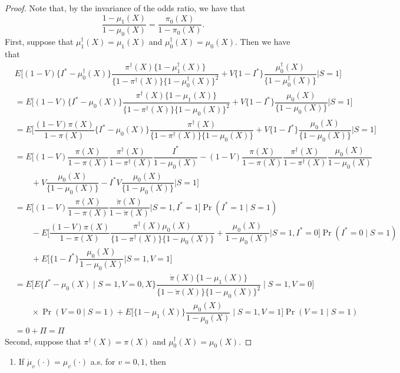 \begin{appendix}
\begin{proof}
    Note that, by the invariance of the odds ratio, we have that
    \begin{equation*}
        \dfrac{1 - \mu_1(X)}{1 - \mu_0(X)} = \dfrac{\pi_0(X)}{1 - \pi_0(X)}.
    \end{equation*}
    First, suppose that $\mu_1^\dagger(X) = \mu_1(X)$ and $\mu_0^\dagger(X) = \mu_0(X)$. Then we have that 
    \begin{align*}
            &E\bigg[(1 - V)\{I^* - \mu^\dagger_0(X)\}\dfrac{\pi^\dagger(X)\{1 - \mu^\dagger_1(X)\}}{\{1 - \pi^\dagger(X)\}\{1 - \mu^\dagger_0(X)\}^2} + V\{1-I^*\}\dfrac{\mu^\dagger_0(X)}{\{1 - \mu^\dagger_0(X)\}}\bigg| S=1\bigg]\\
            &= E\bigg[(1 - V)\{I^* - \mu_0(X)\}\dfrac{\pi^\dagger(X)\{1 - \mu_1(X)\}}{\{1 - \pi^\dagger(X)\}\{1 - \mu_0(X)\}^2} + V\{1-I^*\}\dfrac{\mu_0(X)}{\{1 - \mu_0(X)\}}\bigg| S=1\bigg] \\
            &= E\bigg[\dfrac{(1 - V)\pi(X)}{1 - \pi(X)}\{I^* - \mu_0(X)\}\dfrac{\pi^\dagger(X)}{\{1 - \pi^\dagger(X)\}\{1 - \mu_0(X)\}} + V\{1-I^*\}\dfrac{\mu_0(X)}{\{1 - \mu_0(X)\}}\bigg| S=1\bigg] \\
            &= E\bigg[(1 - V)\dfrac{\pi(X)}{1 - \pi(X)}\dfrac{\pi^\dagger(X)}{1 - \pi^\dagger(X)} \dfrac{I^*}{1 - \mu_0(X)} - (1 - V)\dfrac{\pi(X)}{1 - \pi(X)}\dfrac{\pi^\dagger(X)}{1 - \pi^\dagger(X)} \dfrac{\mu_0(X)}{1 - \mu_0(X)} \\
            &\qquad +  V\dfrac{\mu_0(X)}{\{1 - \mu_0(X)\}} - I^*V \dfrac{\mu_0(X)}{\{1 - \mu_0(X)\}} \bigg| S=1\bigg] \\
            &= E\bigg[(1 - V) \dfrac{\pi(X)}{1 - \pi(X)}\dfrac{\dot\pi(X)}{1 - \dot\pi(X)}\bigg| S=1, I^*=1\bigg]\Pr(I^*=1\mid  S=1) \\
            &\qquad - E\bigg[\dfrac{(1 - V)\pi(X)}{1 - \pi(X)}\dfrac{\pi^\dagger(X)\mu_0(X)}{\{1 - \pi^\dagger(X)\}\{1 - \mu_0(X)\}} + \dfrac{\mu_0(X)}{1-\mu_0(X)}\bigg| S = 1, I^* = 0 \bigg]\Pr(I^*=0\mid  S=1) \\
            &\qquad + E\bigg[\{1-I^*\}\dfrac{\mu_0(X)}{1-\mu_0(X)}\bigg| S = 1, V = 1\bigg] \\
            &= E\bigg[E \{I^*-  \mu_0(X)\mid S=1, V=0, X\}\dfrac{\dot\pi(X)\{1 - \mu_1(X)\}}{\{1 - \dot\pi(X)\}\{1 - \mu_0(X)\}^2} \mid S=1, V = 0\bigg] \\
            &\qquad \times \Pr(V=0\mid  S=1) + E\bigg[\{1-\mu_1(X)\}\dfrac{\mu_0(X)}{1-\mu_0(X)}\mid  S=1, V = 1\bigg] \Pr(V =1 \mid S = 1)\\
            &= 0 + \Pi = \Pi
        \end{align*}
    Second, suppose that $\pi^\dagger(X) = \pi(X)$ and $\mu_0^\dagger(X) = \mu_0(X)$. 
\end{proof}
    \begin{enumerate}
        \item If $\dot\mu_v(\cdot)=\mu_v(\cdot)$ a.s. for $v=0,1$, then
        

\end{enumerate}
\end{appendix}
